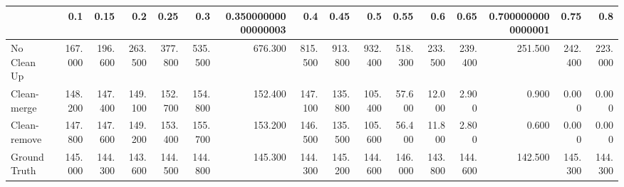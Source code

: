 \begin{tabular}{lrrrrrrrrrrrrrrr}
\toprule
{} &     0.1 &    0.15 &     0.2 &    0.25 &     0.3 & 0.35000000000000003 &     0.4 &    0.45 &     0.5 &    0.55 &     0.6 &    0.65 & 0.7000000000000001 &    0.75 &     0.8 \\
\midrule
No Clean Up  & 167.000 & 196.600 & 263.500 & 377.800 & 535.500 &             676.300 & 815.500 & 913.800 & 932.400 & 518.300 & 233.500 & 239.400 &            251.500 & 242.400 & 223.000 \\
Clean-merge  & 148.200 & 147.400 & 149.100 & 152.700 & 154.800 &             152.400 & 147.100 & 135.800 & 105.400 &  57.600 &  12.000 &   2.900 &              0.900 &   0.000 &   0.000 \\
Clean-remove & 147.800 & 147.600 & 149.200 & 153.400 & 155.700 &             153.200 & 146.500 & 135.500 & 105.600 &  56.400 &  11.800 &   2.800 &              0.600 &   0.000 &   0.000 \\
Ground Truth & 145.000 & 144.300 & 143.600 & 144.500 & 144.800 &             145.300 & 144.300 & 145.200 & 144.600 & 146.000 & 143.800 & 144.600 &            142.500 & 145.300 & 144.300 \\
\bottomrule
\end{tabular}
